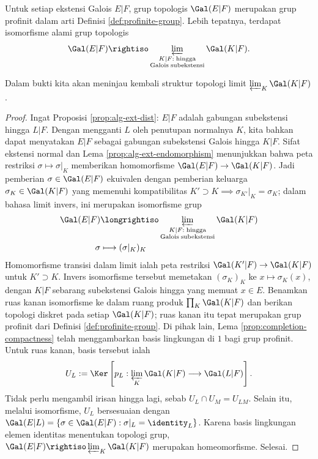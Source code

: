 \begin{lemma}\label{prop:infinite-Galois-profinite}
	Untuk setiap ekstensi Galois $E|F$, grup topologis $\Gal(E|F)$ merupakan grup profinit dalam arti Definisi \ref{def:profinite-group}. Lebih tepatnya, terdapat isomorfisme alami grup topologis
	\[ \Gal(E|F) \rightiso \varprojlim_{\substack{K|F: \;\text{hingga} \\ \mathrm{Galois} \;\text{subekstensi}}} \Gal(K|F). \]
\end{lemma}
Dalam bukti kita akan meninjau kembali struktur topologi limit $\varprojlim_K\Gal(K|F)$.
\begin{proof}	
	Ingat Proposisi \ref{prop:alg-ext-dist}: $E|F$ adalah gabungan subekstensi hingga $L|F$. Dengan mengganti $L$ oleh penutupan normalnya $K$, kita bahkan dapat menyatakan $E|F$ sebagai gabungan subekstensi Galois hingga $K|F$. Sifat ekstensi normal dan Lema \ref{prop:alg-ext-endomorphism} menunjukkan bahwa peta restriksi $\sigma\mapsto\sigma|_K$ memberikan homomorfisme $\Gal(E|F)\to\Gal(K|F)$. Jadi pemberian $\sigma\in\Gal(E|F)$ ekuivalen dengan pemberian keluarga $\sigma_K\in\Gal(K|F)$ yang memenuhi kompatibilitas $K'\supset K\implies\sigma_{K'}|_K=\sigma_K$; dalam bahasa limit invers, ini merupakan isomorfisme grup
	\begin{align*}
		\Gal(E|F) & \longrightiso \varprojlim_{\substack{K|F: \;\text{hingga} \\ \mathrm{Galois} \;\text{subekstensi}}} \Gal(K|F) \\
		\sigma & \longmapsto (\sigma|_K)_K
	\end{align*}
	Homomorfisme transisi dalam limit ialah peta restriksi $\Gal(K'|F)\to\Gal(K|F)$ untuk $K'\supset K$. Invers isomorfisme tersebut memetakan $(\sigma_K)_K$ ke $x\mapsto\sigma_K(x)$, dengan $K|F$ sebarang subekstensi Galois hingga yang memuat $x\in E$. Benamkan ruas kanan isomorfisme ke dalam ruang produk $\prod_K\Gal(K|F)$ dan berikan topologi diskret pada setiap $\Gal(K|F)$; ruas kanan itu tepat merupakan grup profinit dari Definisi \ref{def:profinite-group}. Di pihak lain, Lema \ref{prop:completion-compactness} telah menggambarkan basis lingkungan di $1$ bagi grup profinit. Untuk ruas kanan, basis tersebut ialah
	\[ U_L := \Ker\left[ p_L: \varprojlim_K \Gal(K|F) \longrightarrow \Gal(L|F) \right]. \]
	Tidak perlu mengambil irisan hingga lagi, sebab $U_L\cap U_M=U_{LM}$. Selain itu, melalui isomorfisme, $U_L$ bersesuaian dengan $\Gal(E|L)=\{\sigma\in\Gal(E|F):\sigma|_L=\identity_L\}$. Karena basis lingkungan elemen identitas menentukan topologi grup, $\Gal(E|F)\rightiso\varprojlim_K\Gal(K|F)$ merupakan homeomorfisme. Selesai.
\end{proof}

